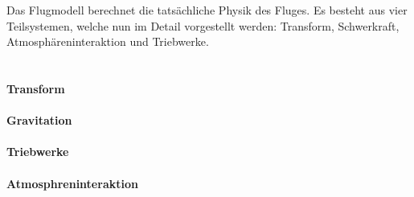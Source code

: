 Das Flugmodell berechnet die tatsächliche Physik des Fluges. Es besteht aus vier Teilsystemen, welche nun im Detail vorgestellt werden: Transform, Schwerkraft, Atmosphäreninteraktion und Triebwerke. \\ \\

\paragraph{Transform}


\paragraph{Gravitation}


\paragraph{Triebwerke}


\paragraph{Atmosphreninteraktion}
